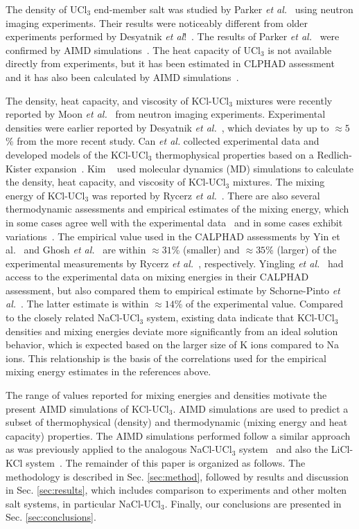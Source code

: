 \documentclass[preprint,3p,10pt,twocolumn,number,sort&compress]{elsarticle}
\begin{document}
The density of UCl$_3$ end-member salt was studied by Parker \textit{et al.}~\cite{Parker} using neutron imaging experiments. Their results were noticeably different from older experiments performed by Desyatnik \textit{et al}!~\cite{Desyatnik2}. The results of Parker \textit{et al.}~\cite{Parker} were confirmed by AIMD simulations~\cite{Andersson}. The heat capacity of UCl$_3$ is not available directly from experiments, but it has been estimated in CLPHAD assessment~\cite{YIN2020,BENES2008}
 and it has also been calculated by AIMD simulations~\cite{Andersson}.
 
The density, heat capacity, and viscosity of KCl-UCl$_3$ mixtures were recently reported by Moon \textit{et al.}~\cite{Moon} from neutron imaging experiments. Experimental densities were earlier reported by Desyatnik \textit{et al.}~\cite{DesyatnikKCl}, which deviates by up to $\approx 5$\% from the more recent study. 
Can \textit{et al.} collected experimental data and developed models of the KCl-UCl$_3$ thermophysical properties based on a Redlich-Kister expansion~\cite{agca2022}. Kim ~\cite{Kim} used molecular dynamics (MD) simulations to calculate the density, heat capacity, and viscosity of KCl-UCl$_3$ mixtures. 
The mixing energy of KCl-UCl$_3$ was reported by Rycerz \textit{et al.}~\cite{Rycerz}. 
There are also several thermodynamic assessments and empirical estimates of the mixing energy, which in some cases agree well with the experimental data~\cite{Rycerz,Yingling} and in some cases exhibit variations~\cite{YIN2020,Ghosh}.
The empirical value used in the CALPHAD assessments by Yin et al.~\cite{YIN2020} and Ghosh \textit{et al.}~\cite{Ghosh} are within $\approx 31$\% (smaller) and $\approx 35$\% (larger) of the experimental measurements by Rycerz \textit{et al.}~\cite{Rycerz}, respectively. Yingling \textit{et al.}~\cite{Yingling} had access to the experimental data on mixing energies in their CALPHAD assessment, but also compared them to empirical estimate by Schorne-Pinto \textit{et al.}~\cite{Pinto}. The latter estimate is within $\approx 14$\% of the experimental value.
Compared to the closely related NaCl-UCl$_3$ system, existing data indicate that KCl-UCl$_3$ densities and mixing energies deviate more significantly from an ideal solution behavior, which is expected based on the larger size of K ions compared to Na ions. This relationship is the basis of the correlations used for the empirical mixing energy estimates in the references above. 

The range of values reported for mixing energies and densities motivate the present AIMD simulations of KCl-UCl$_3$. 
AIMD simulations are used to predict a subset of thermophysical (density) and thermodynamic (mixing energy and heat capacity) properties.
 The AIMD simulations performed 
 follow a similar approach as was previously applied to the analogous NaCl-UCl$_3$ system~\cite{Andersson} and also the LiCl-KCl system~\cite{DUEMMLER2022153414}.  
The remainder of this paper is organized as follows. The methodology is described in Sec. \ref{sec:method}, followed by results and discussion in Sec. \ref{sec:results}, which includes comparison to experiments and other molten salt systems, in particular NaCl-UCl$_3$.  
Finally, our conclusions are presented in Sec. \ref{sec:conclusions}. 
\end{document}
